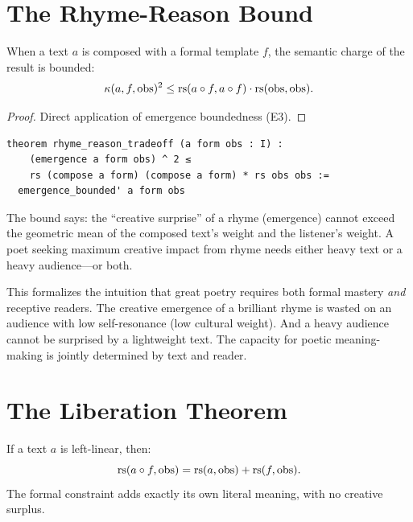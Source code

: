 \section{The Rhyme-Reason Bound}

\begin{theorem}
\label{thm:rhyme-reason}
When a text $a$ is composed with a formal template $f$, the semantic
charge of the result is bounded:
\[
  \kappa(a, f, \mathrm{obs})^2 \leq
  \mathrm{rs}(a \circ f, a \circ f) \cdot \mathrm{rs}(\mathrm{obs}, \mathrm{obs}).
\]
\end{theorem}

\begin{proof}
Direct application of emergence boundedness (E3).
\end{proof}

\begin{lstlisting}
theorem rhyme_reason_tradeoff (a form obs : I) :
    (emergence a form obs) ^ 2 ≤
    rs (compose a form) (compose a form) * rs obs obs :=
  emergence_bounded' a form obs
\end{lstlisting}

\begin{remark}
The bound says: the ``creative surprise'' of a rhyme (emergence) cannot
exceed the geometric mean of the composed text's weight and the
listener's weight.  A poet seeking maximum creative impact from rhyme
needs either heavy text or a heavy audience---or both.

This formalizes the intuition that great poetry requires both formal
mastery \emph{and} receptive readers.  The creative emergence of a
brilliant rhyme is wasted on an audience with low self-resonance
(low cultural weight).  And a heavy audience cannot be surprised by a
lightweight text.  The capacity for poetic meaning-making is jointly
determined by text and reader.
\end{remark}

\section{The Liberation Theorem}

\begin{theorem}
\label{thm:liberation}
If a text $a$ is left-linear, then:
\[
  \mathrm{rs}(a \circ f, \mathrm{obs}) = \mathrm{rs}(a, \mathrm{obs}) + \mathrm{rs}(f, \mathrm{obs}).
\]
The formal constraint adds exactly its own literal meaning, with no
creative surplus.
\end{theorem}

